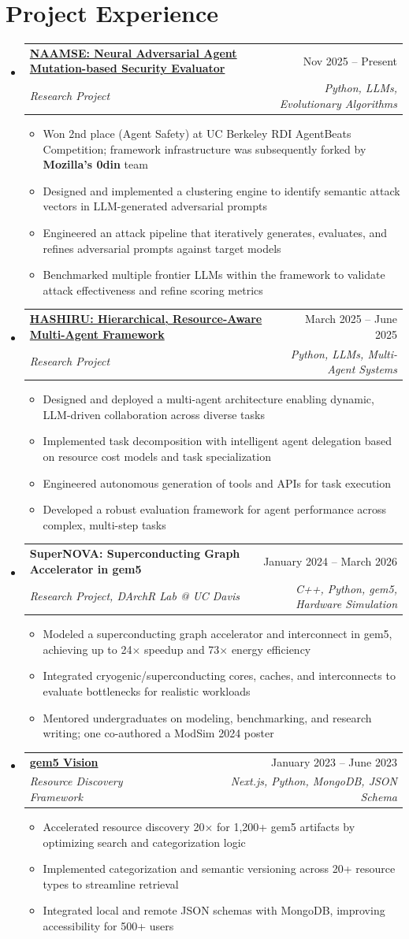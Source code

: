 \documentclass[letterpaper,10pt]{article}
\makeatletter
\newcommand{\resumeItem}[1]{\item\small{#1} \vspace{-3pt}}
\newcommand{\resumeSubheading}[4]{%
  \vspace{-1pt}\item
  \begin{tabular*}{0.97\textwidth}[t]{l@{\extracolsep{\fill}}r}
    \textbf{#1} & #2 \\
    \textit{#3} & \textit{#4} \\
  \end{tabular*}\vspace{-7pt}}
\newcommand{\resumeSubHeadingList}{\begin{itemize}[leftmargin=0.15in, label={}, labelsep=0.15in]}
\newcommand{\resumeJustifiedList}{\begin{itemize}[leftmargin=0.3in, label=\textbullet, labelsep=0.1in]}
\newcommand{\resumeSubHeadingListEnd}{\end{itemize}}
\makeatother
\begin{document}
\section{Project Experience}
{\normalsize
\resumeSubHeadingList
  \resumeSubheading{\href{https://naamse.com}{NAAMSE: Neural Adversarial Agent Mutation-based Security Evaluator}}{Nov 2025 -- Present}{Research Project}{Python, LLMs, Evolutionary Algorithms}
  \resumeJustifiedList
    \resumeItem{Won 2nd place (Agent Safety) at UC Berkeley RDI AgentBeats Competition; framework infrastructure was subsequently forked by \textbf{Mozilla's 0din} team}
    \resumeItem{Designed and implemented a clustering engine to identify semantic attack vectors in LLM-generated adversarial prompts}
    \resumeItem{Engineered an attack pipeline that iteratively generates, evaluates, and refines adversarial prompts against target models}
    \resumeItem{Benchmarked multiple frontier LLMs within the framework to validate attack effectiveness and refine scoring metrics}
  \end{itemize}
  \resumeSubheading{\href{https://github.com/HASHIRU-AI/HASHIRU}{HASHIRU: Hierarchical, Resource-Aware Multi-Agent Framework}}{March 2025 -- June 2025}{Research Project}{Python, LLMs, Multi-Agent Systems}
  \resumeJustifiedList
    \resumeItem{Designed and deployed a multi-agent architecture enabling dynamic, LLM-driven collaboration across diverse tasks}
    \resumeItem{Implemented task decomposition with intelligent agent delegation based on resource cost models and task specialization}
    \resumeItem{Engineered autonomous generation of tools and APIs for task execution}
    \resumeItem{Developed a robust evaluation framework for agent performance across complex, multi-step tasks}
  \end{itemize}
  \resumeSubheading{SuperNOVA: Superconducting Graph Accelerator in gem5}{January 2024 -- March 2026}{Research Project, DArchR Lab @ UC Davis}{C++, Python, gem5, Hardware Simulation}
  \resumeJustifiedList
    \resumeItem{Modeled a superconducting graph accelerator and interconnect in gem5, achieving up to 24$\times$ speedup and 73$\times$ energy efficiency}
    \resumeItem{Integrated cryogenic/superconducting cores, caches, and interconnects to evaluate bottlenecks for realistic workloads}
    \resumeItem{Mentored undergraduates on modeling, benchmarking, and research writing; one co-authored a ModSim 2024 poster}
  \end{itemize}
  \resumeSubheading{\href{https://resources.gem5.org/}{gem5 Vision}}{January 2023 -- June 2023}{Resource Discovery Framework}{Next.js, Python, MongoDB, JSON Schema}
  \resumeJustifiedList
    \resumeItem{Accelerated resource discovery 20$\times$ for 1,200+ gem5 artifacts by optimizing search and categorization logic}
    \resumeItem{Implemented categorization and semantic versioning across 20+ resource types to streamline retrieval}
    \resumeItem{Integrated local and remote JSON schemas with MongoDB, improving accessibility for 500+ users}
  \end{itemize}
\resumeSubHeadingListEnd
}
\end{document}
